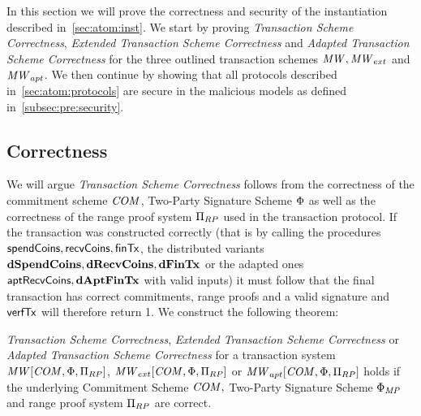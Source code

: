 In this section we will prove the correctness and security of the instantiation described in~\cref{sec:atom:inst}.
We start by proving \emph{Transaction Scheme Correctness}, \emph{Extended Transaction Scheme Correctness} and \emph{Adapted Transaction Scheme Correctness} for the three outlined transaction schemes $\mathit{MW}, \mathit{MW}_{ext}$ and $\mathit{MW}_{apt}$.
We then continue by showing that all protocols described in~\cref{sec:atom:protocols} are secure in the malicious models as defined in~\cref{subsec:pre:security}.

\subsection{Correctness} \label{subsec:atom:correctness}

We will argue \emph{Transaction Scheme Correctness} follows from the correctness of the commitment scheme $\mathit{COM}$, Two-Party Signature Scheme $\Phi$ as well as the correctness of the range proof system $\Pi_{RP}$ used in the transaction protocol.
If the transaction was constructed correctly (that is by calling the procedures $\mathsf{spendCoins}, \mathsf{recvCoins}, \mathsf{finTx}$, the distributed variants $\mathbf{dSpendCoins}, \mathbf{dRecvCoins}, \mathbf{dFinTx}$ or the adapted ones $\mathsf{aptRecvCoins}, \mathbf{dAptFinTx}$ with valid inputs) it must follow that the final transaction has correct commitments, range proofs and a valid signature and $\mathsf{verfTx}$ will therefore return 1.
We construct the following theorem:

\begin{theorem}
    \label{lem:atom:correctness}
    \emph{Transaction Scheme Correctness}, \emph{Extended Transaction Scheme Correctness} or \emph{Adapted Transaction Scheme Correctness} for a transaction system $\mathit{MW}[\mathit{COM},\Phi,\Pi_{RP}]$, $\mathit{MW}_{ext}[\mathit{COM},\Phi,\Pi_{RP}]$ or $\mathit{MW}_{apt}[\mathit{COM},\Phi,\Pi_{RP}]$ holds if the underlying Commitment Scheme $\mathit{COM},$ Two-Party Signature Scheme $\Phi_{\mathit{MP}}$ and range proof system $\Pi_{RP}$ are correct.
\end{theorem}


